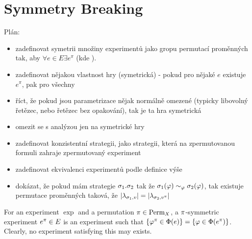 \section{Symmetry Breaking}



Plán:
\begin{itemize}
\item zadefinovat symetrii množiny experimentů jako gropu permutací proměnných tak, aby $\forall e\in E \exists e^\pi$ (kde
).
\item zadefinovat nějakou vlastnost hry (symetrická) - pokud pro nějaké $e$ existuje $e^\pi$, pak pro všechny
\item říct, že pokud jsou parametrizace nějak normálně omezené (typicky libovolný řetězec, nebo řetězec bez opakování), tak je ta hra symetrická
\item omezit se s analýzou jen na symetrické hry
\item zadefinovat konzistentní strategii, jako strategii, která na zpermutovanou formuli zahraje zpermutovaný experiment
\item zadefinovat ekvivalenci experimentů podle definice výše
\item dokázat, že pokud mám strategie $\sigma_1. \sigma_2$ tak že $\sigma_1(\varphi) \sim_\varphi \sigma_2(\varphi)$,
tak existuje permutace proměnných taková, že $|\lambda_{\sigma_1,v}| = |\lambda_{\sigma_2,v^\pi}|$
\end{itemize}

\begin{definition}
For an experiment $\exp$ and a permutation $\pi\in\textrm{Perm}_X$,
  a $\pi$-symmetric experiment $e^\pi\in E$ is an experiment such that
  $\{\varphi^\pi \in\Phi(e)\} = \{\varphi\in\Phi(e^\pi)\}$.
Clearly, no experiment satisfying this may exists.
\end{definition}

